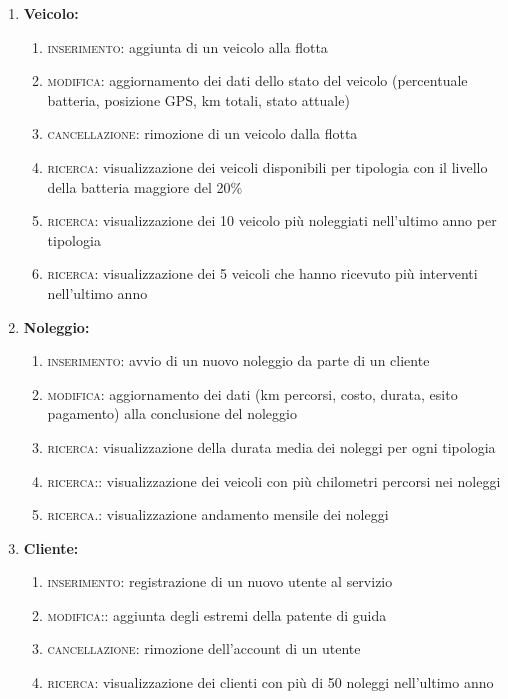 \documentclass{article}
\begin{document}
\begin{enumerate}
    \item \textbf{Veicolo:} 
    \begin{enumerate}
        \item \textsc{inserimento:} aggiunta di un veicolo alla flotta
        \item \textsc{modifica:} aggiornamento dei dati dello stato del veicolo (percentuale batteria, posizione GPS, km totali, stato attuale)
        \item \textsc{cancellazione:} rimozione di un veicolo dalla flotta
        \item \textsc{ricerca:} visualizzazione dei veicoli disponibili per tipologia con il livello della batteria maggiore del 20\%
        \item \textsc{ricerca:} visualizzazione dei 10 veicolo più noleggiati nell'ultimo anno per tipologia
        \item \textsc{ricerca}: visualizzazione dei 5 veicoli che hanno ricevuto più interventi nell'ultimo anno
    \end{enumerate}
    \item \textbf{Noleggio:}
    \begin{enumerate}
        \item \textsc{inserimento:} avvio di un nuovo noleggio da parte di un cliente
        \item \textsc{modifica:} aggiornamento dei dati (km percorsi, costo, durata, esito pagamento) alla conclusione del noleggio
        \item \textsc{ricerca:} visualizzazione della durata media dei noleggi per ogni tipologia
        \item \textsc{ricerca:}: visualizzazione dei veicoli con più chilometri percorsi nei noleggi
        \item \textsc{ricerca.}: visualizzazione andamento mensile dei noleggi
    \end{enumerate}
    \item \textbf{Cliente:}
    \begin{enumerate}
        \item \textsc{inserimento:} registrazione di un nuovo utente al servizio
        \item \textsc{modifica:}: aggiunta degli estremi della patente di guida
        \item \textsc{cancellazione:} rimozione dell'account di un utente
        \item \textsc{ricerca:} visualizzazione dei clienti con più di 50 noleggi nell'ultimo anno

\end{enumerate}
\end{enumerate}
\end{document}
